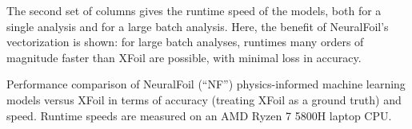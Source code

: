 \documentclass[conf]{new-aiaa}
\begin{document}
    The second set of columns gives the runtime speed of the models, both for a single analysis and for a large batch analysis. Here, the benefit of NeuralFoil's vectorization is shown: for large batch analyses, runtimes many orders of magnitude faster than XFoil are possible, with minimal loss in accuracy.

    \begin{table}[h]
        \begin{centering}
        \caption{Performance comparison of NeuralFoil (``NF'') physics-informed machine learning models versus XFoil in terms of accuracy (treating XFoil as a ground truth) and speed. Runtime speeds are measured on an AMD Ryzen 7 5800H laptop CPU.}
        \label{tab:neuralfoil_performance}

        \begin{adjustbox}{width=\textwidth}


\end{adjustbox}
\end{centering}
\end{table}
\end{document}

